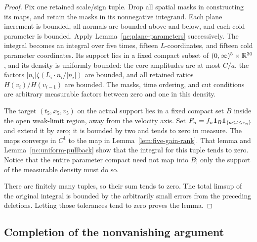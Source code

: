 \begin{proof}
Fix one retained scale/sign tuple.  Drop all spatial masks in
constructing its maps, and retain the masks in its nonnegative
integrand.  Each plane increment is bounded, all normals are
bounded above and below, and each cold parameter is bounded.
Apply Lemma~\ref{nc:plane-parameters} successively.  The integral
becomes an integral over five times, fifteen \(L\)-coordinates,
and fifteen cold parameter coordinates.  Its support lies in
a fixed compact subset of
\((0,\infty)^5\times\mathbb R^{30}\), and its density is uniformly
bounded: the core amplitudes are at most \(C/a\), the factors
\(|n_i|\zeta(L_i\cdot n_i/|n_i|)\) are bounded, and all retained
ratios \(H(v_i)/H(v_{i-1})\) are bounded.  The masks, time
ordering, and cut conditions are arbitrary measurable factors
between zero and one in this density.

The target \((t_5,x_5,v_5)\) on the actual support lies in a
fixed compact set \(B\) inside the open weak-limit region, away
from the velocity axis.  Set
\(F_n=f_n\mathbf 1_B\mathbf 1_{\{a\le t\le\tau_n\}}\) and extend it by zero;
it is bounded by two and tends to zero in measure.  The maps converge
in \(C^1\) to the map in Lemma~\ref{lem:five-gain-rank}.
That lemma and Lemma~\ref{nc:uniform-pullback} show that the
integral for this tuple tends to zero.  Notice that the entire
parameter compact need not map into \(B\); only the support of
the measurable density must do so.

There are finitely many tuples, so their sum tends to zero.
The total limsup of the original integral is bounded by the
arbitrarily small errors from the preceding deletions.
Letting those tolerances tend to zero proves the lemma.
\end{proof}

\subsection{Completion of the nonvanishing argument}

